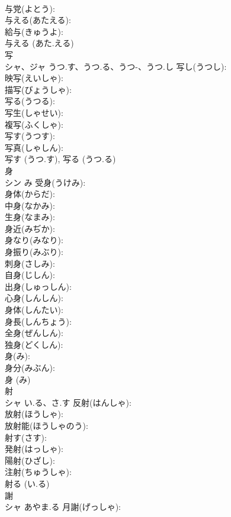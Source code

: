\documentclass[8pt]{extreport}
\begin{document}
\begin{CJK}{UTF8}{min}
\\	与党(よとう): 
\\	与える(あたえる): 
\\	給与(きゅうよ): 
\\	与える (あた.える)
\\	写			
\\	シャ、ジャ	うつ.す、うつ.る、うつ-、うつ.し	写し(うつし): 
\\	映写(えいしゃ): 
\\	描写(びょうしゃ): 
\\	写る(うつる): 
\\	写生(しゃせい): 
\\	複写(ふくしゃ): 
\\	写す(うつす): 
\\	写真(しゃしん): 
\\	写す (うつ.す), 写る (うつ.る)
\\	身			
\\	シン	み	受身(うけみ): 
\\	身体(からだ): 
\\	中身(なかみ): 
\\	生身(なまみ): 
\\	身近(みぢか): 
\\	身なり(みなり): 
\\	身振り(みぶり): 
\\	刺身(さしみ): 
\\	自身(じしん): 
\\	出身(しゅっしん): 
\\	心身(しんしん): 
\\	身体(しんたい): 
\\	身長(しんちょう): 
\\	全身(ぜんしん): 
\\	独身(どくしん): 
\\	身(み): 
\\	身分(みぶん): 
\\	身 (み)
\\	射			
\\	シャ	い.る、さ.す	反射(はんしゃ): 
\\	放射(ほうしゃ): 
\\	放射能(ほうしゃのう): 
\\	射す(さす): 
\\	発射(はっしゃ): 
\\	陽射(ひざし): 
\\	注射(ちゅうしゃ): 
\\	射る (い.る)
\\	謝			
\\	シャ	あやま.る	月謝(げっしゃ): 

\end{CJK}
\end{document}
